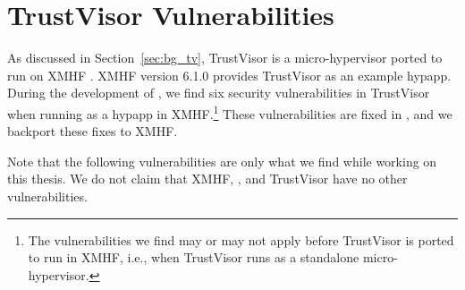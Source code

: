 \chapter{TrustVisor Vulnerabilities}
\label{sec:vulnerabilities_xmhf_tv}

As discussed in Section~\ref{sec:bg_tv}, TrustVisor is a micro-hypervisor ported to run on XMHF \cite{vasudevan2013design}. XMHF version 6.1.0 provides TrustVisor as an example hypapp. During the development of , we find six security vulnerabilities in TrustVisor when running as a hypapp in XMHF.\footnote{The vulnerabilities we find may or may not apply before TrustVisor is ported to run in XMHF, i.e., when TrustVisor runs as a standalone micro-hypervisor.} These vulnerabilities are fixed in , and we backport these fixes to XMHF.

Note that the following vulnerabilities are only what we find while working on this thesis. We do not claim that XMHF, , and TrustVisor have no other vulnerabilities.








